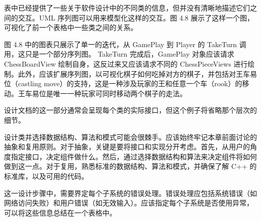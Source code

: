 表中已经提供了一些关于软件设计中的不同类的信息，但并没有清晰地描述它们之间的交互。UML 序列图可以用来模型化这样的交互。图 4.8 展示了这样一个图，可视化了前一个表格中一些类之间的关系。


图 4.8 中的图表只展示了单一的迭代，从 GamePlay 到 Player 的 TakeTurn 调用，这只是一个部分序列图。 TakeTurn 完成后，GamePlay 对象应该请求 ChessBoardView 绘制自身，这反过来又应该请求不同的 ChessPieceViews 进行绘制。此外，应该扩展序列图，以可视化棋子如何吃掉对方的棋子，并包括对王车易位（castling move）的支持，这是一种涉及玩家的王和任意一个车（rook）的移动。王车易位是唯一一种玩家可同时移动两个棋子的走法。

设计文档的这一部分通常会呈现每个类的实际接口，但这个例子将省略那个层次的细节。

设计类并选择数据结构、算法和模式可能会很棘手。应该始终牢记本章前面讨论的抽象和复用原则。对于抽象，关键是要将接口和实现分开考虑。首先，从用户的角度指定接口，决定组件做什么。然后，通过选择数据结构和算法来决定组件将如何做到这一点。对于复用，熟悉标准的数据结构、算法和模式，并确保了解 C++ 的标准库，以及可用的代码。


这一设计步骤中，需要界定每个子系统的错误处理。错误处理应包括系统错误（如网络访问失败）和用户错误（如无效输入）。应该指定每个子系统是否使用异常，可以将这些信息总结在一个表格中。

